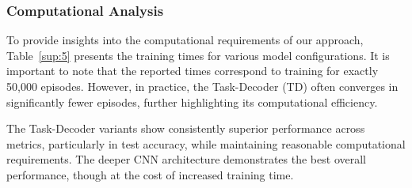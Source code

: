 \begin{table}[htbp]
\centering
\caption{Comparison of few-shot classification accuracies (\%) on MiniImageNet using MAML and Task-Decoder models. Results are reported for 5-way 1-shot and 5-way 5-shot settings, including Train, Validation, and Test accuracies.}
\label{sup:4}
\end{table}

\subsubsection{Computational Analysis}

To provide insights into the computational requirements of our approach, Table~\ref{sup:5} presents the training times for various model configurations. {\color{black}It is important to note that the reported times correspond to training for exactly 50,000 episodes. However, in practice, the Task-Decoder (TD) often converges in significantly fewer episodes, further highlighting its computational efficiency.}

\begin{table}[htbp]
\centering
\caption{Comparison of training times (in hours) on MiniImageNet using MAML and Task-Decoder models for 5-way 1-shot and 5-way 5-shot experiments.}
\label{sup:5}
\end{table}

The Task-Decoder variants show consistently superior performance across metrics, particularly in test accuracy, while maintaining reasonable computational requirements. The deeper CNN architecture demonstrates the best overall performance, though at the cost of increased training time.

